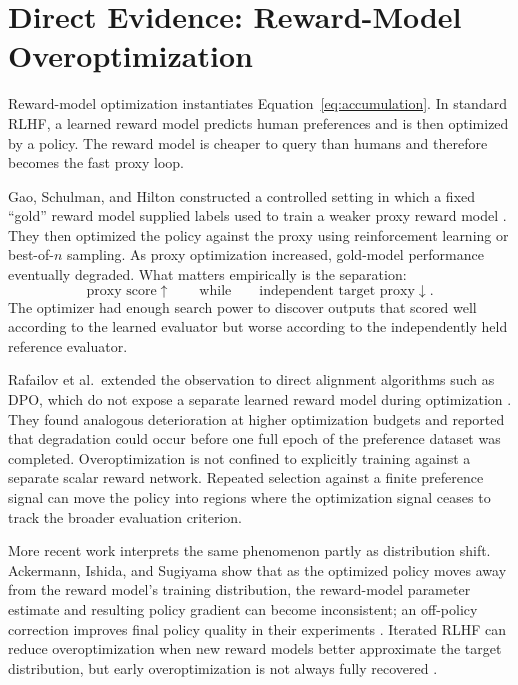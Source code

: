 \documentclass[11pt]{article}
\begin{document}
\section{Direct Evidence: Reward-Model Overoptimization}

Reward-model optimization instantiates Equation~\eqref{eq:accumulation}. In standard RLHF, a learned reward model predicts human preferences and is then optimized by a policy. The reward model is cheaper to query than humans and therefore becomes the fast proxy loop.

Gao, Schulman, and Hilton constructed a controlled setting in which a fixed ``gold'' reward model supplied labels used to train a weaker proxy reward model \parencite{gao2022overoptimization}. They then optimized the policy against the proxy using reinforcement learning or best-of-\(n\) sampling. As proxy optimization increased, gold-model performance eventually degraded. What matters empirically is the separation:
\[
\text{proxy score}\uparrow
\qquad\text{while}\qquad
\text{independent target proxy}\downarrow.
\]
The optimizer had enough search power to discover outputs that scored well according to the learned evaluator but worse according to the independently held reference evaluator.

Rafailov et al.\ extended the observation to direct alignment algorithms such as DPO, which do not expose a separate learned reward model during optimization \parencite{rafailov2024direct}. They found analogous deterioration at higher optimization budgets and reported that degradation could occur before one full epoch of the preference dataset was completed. Overoptimization is not confined to explicitly training against a separate scalar reward network. Repeated selection against a finite preference signal can move the policy into regions where the optimization signal ceases to track the broader evaluation criterion.

More recent work interprets the same phenomenon partly as distribution shift. Ackermann, Ishida, and Sugiyama show that as the optimized policy moves away from the reward model's training distribution, the reward-model parameter estimate and resulting policy gradient can become inconsistent; an off-policy correction improves final policy quality in their experiments \parencite{ackermann2025offpolicy}. Iterated RLHF can reduce overoptimization when new reward models better approximate the target distribution, but early overoptimization is not always fully recovered \parencite{wolf2025iterated}.
\end{document}
